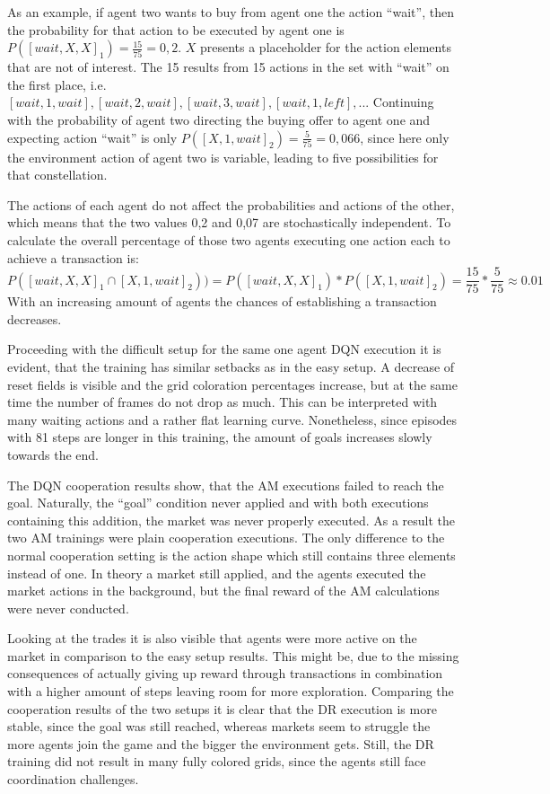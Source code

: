 As an example, if agent two wants to buy from agent one the action ``wait'', then the probability for that action to be executed by agent one is $P([wait,X,X]_1) = \frac{15}{75}=0,2$. $X$ presents a placeholder for the action elements that are not of interest. The 15 results from 15 actions in the set with ``wait'' on the first place, i.e. $[wait,1,wait], [wait,2,wait], [wait,3,wait], [wait,1,left],$... Continuing with the probability of agent two directing the buying offer to agent one and expecting action ``wait'' is only $P([X,1,wait]_2)=\frac{5}{75}=0,066$, since here only the environment action of agent two is variable, leading to five possibilities for that constellation. 

The actions of each agent do not affect the probabilities and actions of the other, which means that the two values 0,2 and 0,07 are stochastically independent. To calculate the overall percentage of those two agents executing one action each to achieve a transaction is:
\begin{equation}\label{eq:TRPO}
    P([wait,X,X]_1 \cap [X,1,wait]_2))=P([wait,X,X]_1) * P([X,1,wait]_2) = \frac{15}{75}*\frac{5}{75} \approx 0.01
\end{equation}
With an increasing amount of agents the chances of establishing a transaction decreases.

Proceeding with the difficult setup for the same one agent DQN execution it is evident, that the training has similar setbacks as in the easy setup. A decrease of reset fields is visible and the grid coloration percentages increase, but at the same time the number of frames do not drop as much. This can be interpreted with many waiting actions and a rather flat learning curve. Nonetheless, since episodes with 81 steps are longer in this training, the amount of goals increases slowly towards the end.

The DQN cooperation results show, that the AM executions failed to reach the goal. Naturally, the ``goal'' condition never applied and with both executions containing this addition, the market was never properly executed. As a result the two AM trainings were plain cooperation executions. The only difference to the normal cooperation setting is the action shape which still contains three elements instead of one. In theory a market still applied, and the agents executed the market actions in the background, but the final reward of the AM calculations were never conducted. 

Looking at the trades it is also visible that agents were more active on the market in comparison to the easy setup results. This might be, due to the missing consequences of actually giving up reward through transactions in combination with a higher amount of steps leaving room for more exploration. Comparing the cooperation results of the two setups it is clear that the DR execution is more stable, since the goal was still reached, whereas markets seem to struggle the more agents join the game and the bigger the environment gets. Still, the DR training did not result in many fully colored grids, since the agents still face coordination challenges.

